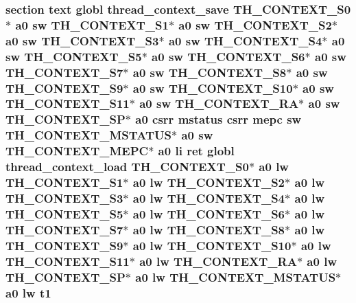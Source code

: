 \hypertarget{riscv_2threada_8S_a8ccb14cfe9c364958911fbd28cd882c2}{
\subsubsection[{t1}]{\setlength{\rightskip}{0pt plus 5cm}section text globl {\bf thread\-\_\-context\-\_\-save} {\bf T\-H\-\_\-\-C\-O\-N\-T\-E\-X\-T\-\_\-\-S0}$\ast$ {\bf a0} {\bf sw} {\bf T\-H\-\_\-\-C\-O\-N\-T\-E\-X\-T\-\_\-\-S1}$\ast$ {\bf a0} {\bf sw} {\bf T\-H\-\_\-\-C\-O\-N\-T\-E\-X\-T\-\_\-\-S2}$\ast$ {\bf a0} {\bf sw} {\bf T\-H\-\_\-\-C\-O\-N\-T\-E\-X\-T\-\_\-\-S3}$\ast$ {\bf a0} {\bf sw} {\bf T\-H\-\_\-\-C\-O\-N\-T\-E\-X\-T\-\_\-\-S4}$\ast$ {\bf a0} {\bf sw} {\bf T\-H\-\_\-\-C\-O\-N\-T\-E\-X\-T\-\_\-\-S5}$\ast$ {\bf a0} {\bf sw} {\bf T\-H\-\_\-\-C\-O\-N\-T\-E\-X\-T\-\_\-\-S6}$\ast$ {\bf a0} {\bf sw} {\bf T\-H\-\_\-\-C\-O\-N\-T\-E\-X\-T\-\_\-\-S7}$\ast$ {\bf a0} {\bf sw} {\bf T\-H\-\_\-\-C\-O\-N\-T\-E\-X\-T\-\_\-\-S8}$\ast$ {\bf a0} {\bf sw} {\bf T\-H\-\_\-\-C\-O\-N\-T\-E\-X\-T\-\_\-\-S9}$\ast$ {\bf a0} {\bf sw} {\bf T\-H\-\_\-\-C\-O\-N\-T\-E\-X\-T\-\_\-\-S10}$\ast$ {\bf a0} {\bf sw} {\bf T\-H\-\_\-\-C\-O\-N\-T\-E\-X\-T\-\_\-\-S11}$\ast$ {\bf a0} {\bf sw} {\bf T\-H\-\_\-\-C\-O\-N\-T\-E\-X\-T\-\_\-\-R\-A}$\ast$ {\bf a0} {\bf sw} {\bf T\-H\-\_\-\-C\-O\-N\-T\-E\-X\-T\-\_\-\-S\-P}$\ast$ {\bf a0} csrr {\bf mstatus} csrr {\bf mepc} {\bf sw} {\bf T\-H\-\_\-\-C\-O\-N\-T\-E\-X\-T\-\_\-\-M\-S\-T\-A\-T\-U\-S}$\ast$ {\bf a0} {\bf sw} {\bf T\-H\-\_\-\-C\-O\-N\-T\-E\-X\-T\-\_\-\-M\-E\-P\-C}$\ast$ {\bf a0} {\bf li} ret globl {\bf thread\-\_\-context\-\_\-load} {\bf T\-H\-\_\-\-C\-O\-N\-T\-E\-X\-T\-\_\-\-S0}$\ast$ {\bf a0} {\bf lw} {\bf T\-H\-\_\-\-C\-O\-N\-T\-E\-X\-T\-\_\-\-S1}$\ast$ {\bf a0} {\bf lw} {\bf T\-H\-\_\-\-C\-O\-N\-T\-E\-X\-T\-\_\-\-S2}$\ast$ {\bf a0} {\bf lw} {\bf T\-H\-\_\-\-C\-O\-N\-T\-E\-X\-T\-\_\-\-S3}$\ast$ {\bf a0} {\bf lw} {\bf T\-H\-\_\-\-C\-O\-N\-T\-E\-X\-T\-\_\-\-S4}$\ast$ {\bf a0} {\bf lw} {\bf T\-H\-\_\-\-C\-O\-N\-T\-E\-X\-T\-\_\-\-S5}$\ast$ {\bf a0} {\bf lw} {\bf T\-H\-\_\-\-C\-O\-N\-T\-E\-X\-T\-\_\-\-S6}$\ast$ {\bf a0} {\bf lw} {\bf T\-H\-\_\-\-C\-O\-N\-T\-E\-X\-T\-\_\-\-S7}$\ast$ {\bf a0} {\bf lw} {\bf T\-H\-\_\-\-C\-O\-N\-T\-E\-X\-T\-\_\-\-S8}$\ast$ {\bf a0} {\bf lw} {\bf T\-H\-\_\-\-C\-O\-N\-T\-E\-X\-T\-\_\-\-S9}$\ast$ {\bf a0} {\bf lw} {\bf T\-H\-\_\-\-C\-O\-N\-T\-E\-X\-T\-\_\-\-S10}$\ast$ {\bf a0} {\bf lw} {\bf T\-H\-\_\-\-C\-O\-N\-T\-E\-X\-T\-\_\-\-S11}$\ast$ {\bf a0} {\bf lw} {\bf T\-H\-\_\-\-C\-O\-N\-T\-E\-X\-T\-\_\-\-R\-A}$\ast$ {\bf a0} {\bf lw} {\bf T\-H\-\_\-\-C\-O\-N\-T\-E\-X\-T\-\_\-\-S\-P}$\ast$ {\bf a0} {\bf lw} {\bf T\-H\-\_\-\-C\-O\-N\-T\-E\-X\-T\-\_\-\-M\-S\-T\-A\-T\-U\-S}$\ast$ {\bf a0} {\bf lw} t1}}\label{riscv_2threada_8S_a8ccb14cfe9c364958911fbd28cd882c2}
